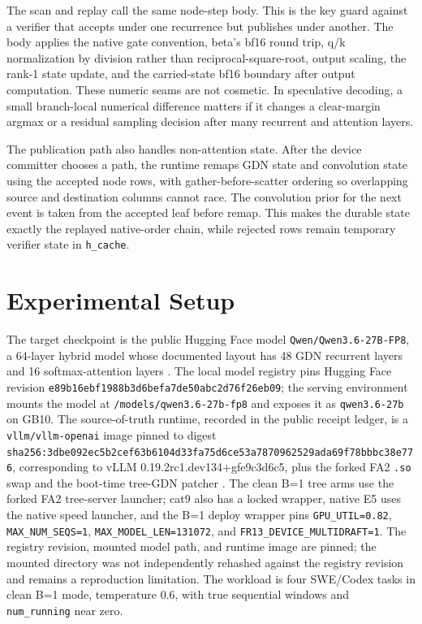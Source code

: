 \documentclass[conference]{IEEEtran}
\newcommand{\code}[1]{\texttt{#1}}
\begin{document}
The scan and replay call the same node-step body. This is the key guard against a verifier that accepts under one recurrence but publishes under another. The body applies the native gate convention, beta's bf16 round trip, q/k normalization by division rather than reciprocal-square-root, output scaling, the rank-1 state update, and the carried-state bf16 boundary after output computation. These numeric seams are not cosmetic. In speculative decoding, a small branch-local numerical difference matters if it changes a clear-margin argmax or a residual sampling decision after many recurrent and attention layers.

The publication path also handles non-attention state. After the device committer chooses a path, the runtime remaps GDN state and convolution state using the accepted node rows, with gather-before-scatter ordering so overlapping source and destination columns cannot race. The convolution prior for the next event is taken from the accepted leaf before remap. This makes the durable state exactly the replayed native-order chain, while rejected rows remain temporary verifier state in \code{h\_cache}.

\section{Experimental Setup}

The target checkpoint is the public Hugging Face model \code{Qwen/Qwen3.6-27B-FP8}, a 64-layer hybrid model whose documented layout has 48 GDN recurrent layers and 16 softmax-attention layers \cite{qwen2026qwen36fp8}. The local model registry pins Hugging Face revision \code{e89b16ebf1988b3d6befa7de50abc2d76f26eb09}; the serving environment mounts the model at \code{/models/qwen3.6-27b-fp8} and exposes it as \code{qwen3.6-27b} on GB10. The source-of-truth runtime, recorded in the public receipt ledger, is a \code{vllm/vllm-openai} image pinned to digest \texttt{sha256:3dbe092ec5b2cef63b6}\allowbreak\texttt{104d33fa75d6ce53a7870962}\allowbreak\texttt{529ada69f78bbbc38e776}, corresponding to vLLM 0.19.2rc1.dev134+gfe9c3d6c5, plus the forked FA2 \code{.so} swap and the boot-time tree-GDN patcher \cite{lumo2026receipts}. The clean B=1 tree arms use the forked FA2 tree-server launcher; cat9 also has a locked wrapper, native E5 uses the native speed launcher, and the B=1 deploy wrapper pins \code{GPU\_UTIL=0.82}, \code{MAX\_NUM\_SEQS=1}, \code{MAX\_MODEL\_LEN=131072}, and \code{FR13\_DEVICE\_MULTIDRAFT=1}. The registry revision, mounted model path, and runtime image are pinned; the mounted directory was not independently rehashed against the registry revision and remains a reproduction limitation. The workload is four SWE/Codex tasks in clean B=1 mode, temperature 0.6, with true sequential windows and \code{num\_running} near zero.
\end{document}
